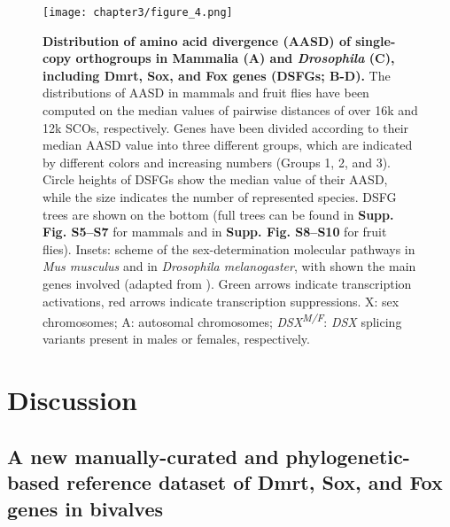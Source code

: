 \documentclass[../main.tex]{subfiles}
\begin{document}
\begin{figure}
	\centering
	\texttt{[image: chapter3/figure\_4.png]}
	\captionsetup{width=\textwidth}
	\caption{
		\textbf{Distribution of amino acid divergence (AASD) of single-copy orthogroups in Mammalia (A) and \textit{Drosophila} (C), including Dmrt, Sox, and Fox genes (DSFGs; B-D).} The distributions of AASD in mammals and fruit flies have been computed on the median values of pairwise distances of over 16k and 12k SCOs, respectively. Genes have been divided according to their median AASD value into three different groups, which are indicated by different colors and increasing numbers (Groups 1, 2, and 3). Circle heights of DSFGs show the median value of their AASD, while the size indicates the number of represented species. DSFG trees are shown on the bottom (full trees can be found in \textbf{Supp. Fig. S5--S7} for mammals and in \textbf{Supp. Fig. S8--S10} for fruit flies). Insets: scheme of the sex-determination molecular pathways in \textit{Mus musculus} and in \textit{Drosophila melanogaster}, with shown the main genes involved (adapted from \textbf{\cite{beukeboom2014evolution}}). Green arrows indicate transcription activations, red arrows indicate transcription suppressions. X: sex chromosomes; A: autosomal chromosomes; \textit{DSX\textsuperscript{M/F}}: \textit{DSX} splicing variants present in males or females, respectively.
	}
	\label{fig:DSFG_testDivergence}
\end{figure}

\section{Discussion} \label{chpater3_discussion}
\subsection{A new manually-curated and phylogenetic-based reference dataset of Dmrt, Sox, and Fox genes in bivalves}
\end{document}
